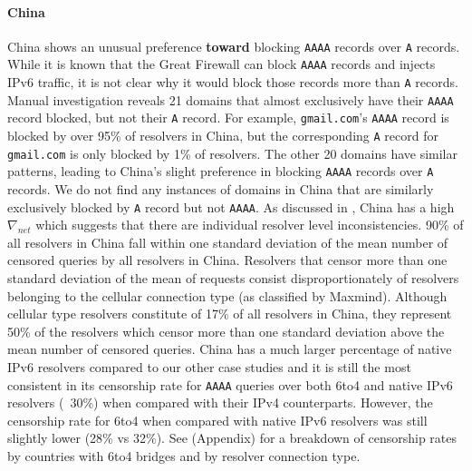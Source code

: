 \paragraph{China}
China shows an unusual preference \textbf{toward} blocking \texttt{AAAA} records
over \texttt{A} records. While it is known that the Great Firewall can block
\texttt{AAAA} records and injects IPv6 traffic, it is not clear why it would
block those records more than \texttt{A} records. Manual investigation reveals
21 domains that almost exclusively have their \texttt{AAAA} record blocked, but
not their \texttt{A} record. For example, \texttt{gmail.com}'s \texttt{AAAA}
record is blocked by over 95\% of resolvers in China, but the corresponding
\texttt{A} record for \texttt{gmail.com} is only blocked by 1\% of resolvers.
The other 20 domains have similar patterns, leading to China's slight preference
in blocking \texttt{AAAA} records over \texttt{A} records. We do not find any
instances of domains in China that are similarly exclusively blocked by
\texttt{A} record but not \texttt{AAAA}. As discussed in
, China has a high $\nabla_{net}$ which
suggests that there are individual resolver level inconsistencies. 90\% of all
resolvers in China fall within one standard deviation of the mean number of
censored queries by all resolvers in China. Resolvers that censor more than one
standard deviation of the mean of requests consist disproportionately of
resolvers belonging to the cellular connection type (as classified by Maxmind).
Although cellular type resolvers constitute of 17\% of all resolvers in China,
they represent 50\% of the resolvers which censor more than one standard
deviation above the mean number of censored queries. China has a much larger
percentage of native IPv6 resolvers compared to our other case studies and it is
still the most consistent in its censorship rate for \texttt{AAAA} queries over
both 6to4 and native IPv6 resolvers (~30\%) when compared with their IPv4
counterparts. However, the censorship rate for 6to4 when compared with native
IPv6 resolvers was still slightly lower (28\% vs 32\%). See
 (Appendix) for a breakdown of censorship
rates by countries with 6to4 bridges and by resolver connection type.


